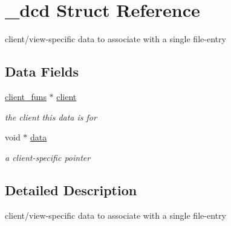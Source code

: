 \hypertarget{struct__dcd}{
\section{\_\-dcd Struct Reference}
\label{struct__dcd}
}
client/view-specific data to associate with a single file-entry  


\subsection*{Data Fields}
\begin{CompactItemize}
\item 
\hypertarget{struct__dcd_o0}{
\hyperlink{struct__client__funs}{client\_\-funs} $\ast$ \hyperlink{struct__dcd_o0}{client}}
\label{struct__dcd_o0}

\begin{CompactList}\small\item\em the client this data is for \item\end{CompactList}\item 
\hypertarget{struct__dcd_o1}{
void $\ast$ \hyperlink{struct__dcd_o1}{data}}
\label{struct__dcd_o1}

\begin{CompactList}\small\item\em a client-specific pointer \item\end{CompactList}\end{CompactItemize}


\subsection{Detailed Description}
client/view-specific data to associate with a single file-entry 

